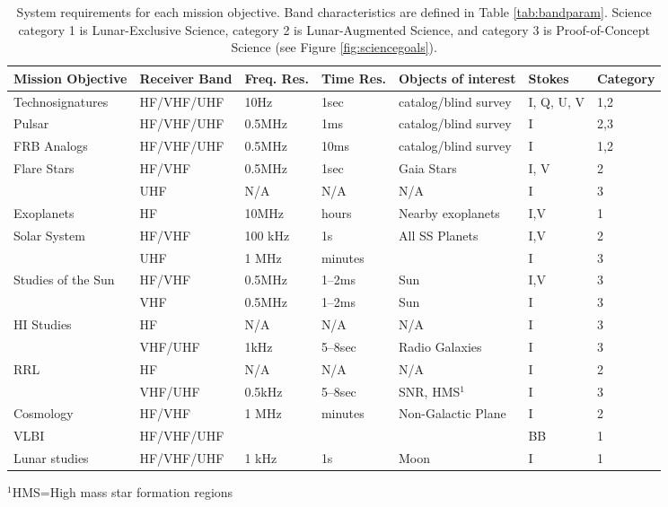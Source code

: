 \begin{table}
\centering
\caption{System requirements for each mission objective.
Band characteristics are defined in Table \ref{tab:bandparam}. Science category 1 is Lunar-Exclusive Science, category 2 is Lunar-Augmented Science, and category 3 is Proof-of-Concept Science (see Figure \ref{fig:sciencegoals}). }
\begin{tabular}{|l|l|l|l|l|l|l|}\hline
\label{tab:scisum}
\textbf{Mission Objective} & \textbf{Receiver Band} & \textbf{Freq. Res.} & \textbf{Time Res.} & \textbf{Objects of interest} & \textbf{Stokes} & \textbf{Category} \\\hline
Technosignatures & HF/VHF/UHF & 10Hz & 1sec & catalog/blind survey & I, Q, U, V & 1,2 \\\hline
Pulsar & HF/VHF/UHF & 0.5MHz & 1ms & catalog/blind survey & I & 2,3 \\\hline
FRB Analogs & HF/VHF/UHF & 0.5MHz & 10ms & catalog/blind survey & I & 1,2 \\\hline
Flare Stars & HF/VHF & 0.5MHz & 1sec & Gaia Stars & I, V & 2 \\\hline
 & UHF & N/A & N/A & N/A & I & 3 \\\hline
Exoplanets & HF & 10MHz & hours & Nearby exoplanets & I,V & 1 \\\hline
Solar System & HF/VHF & 100 kHz & 1s & All SS Planets & I,V & 2 \\\hline
 & UHF & 1 MHz & minutes &  & I & 3 \\\hline
Studies of the Sun & HF/VHF & 0.5MHz & 1--2ms & Sun & I,V & 3 \\\hline
 & VHF & 0.5MHz & 1--2ms & Sun & I & 3 \\\hline
HI Studies & HF & N/A & N/A & N/A & I & 3 \\\hline
 & VHF/UHF & 1kHz & 5--8sec & Radio Galaxies & I & 3 \\\hline
RRL & HF & N/A & N/A & N/A & I & 2 \\\hline
 & VHF/UHF & 0.5kHz & 5--8sec & SNR, HMS$^{1}$ & I & 3 \\\hline
Cosmology & HF/VHF & 1 MHz & minutes & Non-Galactic Plane & I & 2 \\\hline
VLBI & HF/VHF/UHF &  &  &  & BB & 1 \\\hline
Lunar studies & HF/VHF/UHF & 1 kHz & 1s & Moon & I & 1 \\\hline
\end{tabular}
$^{1}$HMS=High mass star formation regions
\end{table}



